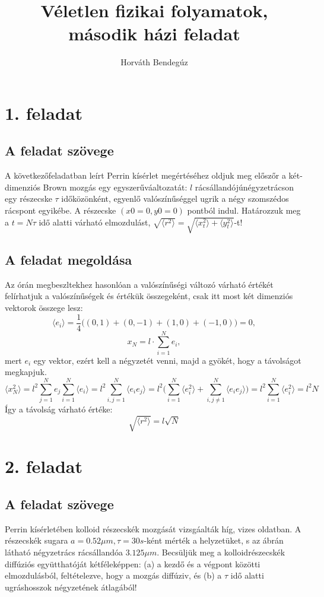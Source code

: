 \documentclass[12pt]{article}
\title{Véletlen fizikai folyamatok, második házi feladat}
\author{Horváth Bendegúz}
\begin{document}
\maketitle



\section*{1. feladat}

\subsection*{ A feladat szövege} A következőfeladatban leírt Perrin kísérlet megértéséhez oldjuk meg előszőr a két-dimenziós Brown mozgás
egy egyszerűváaltozatát: $l$ rácsállandójúnégyzetrácson egy részecske $\tau$ időközönként, egyenlő valószínűséggel ugrik a négy szomszédos rácspont egyikébe. A részecske $ (x0 = 0, y0 = 0)$ pontból indul.
Határozzuk meg a $t = N\tau $ idő alatti várható elmozdulást,  $\sqrt{\langle r^2 \rangle }= \sqrt{\langle x^2_t \rangle+ \langle y^2_t\rangle}$-t!

 
\subsection*{A feladat megoldása} Az órán megbeszltekhez hasonlóan a valószínűségi változó várható értékét felírhatjuk a valószínűségek és értékük összegeként, csak itt most két dimenziós vektorok összege lesz:
$$\langle e_i \rangle = \frac{1}{4}\big ( (0, 1)+(0,-1)+(1,0)+(-1,0)\big ) =0, $$
$$ x_N = l\cdot \sum_{i=1}^N e_i,$$
mert $e_i$ egy vektor, ezért kell a négyzetét venni, majd a gyökét, hogy a távolságot megkapjuk.
$$\langle x^2_N\rangle = l^2\sum_{j=1}^Ne_j\sum_{i=1}^N \langle e_i \rangle = l^2\sum_{i,j=1}^N \langle e_i e_j\rangle = l^2 \Big (\sum_{i=1}^N \langle e^2_i \rangle +\sum_{i,j \neq 1}^N\langle e_i e_j \rangle \Big ) = l^2 \sum_{i=1}^N \langle e^2_i \rangle = {l^2N}$$
Így a távolság várható értéke:
$$\sqrt{\langle r^2 \rangle} = l\sqrt{N} $$
 
\newpage
\section*{2. feladat}

\subsection*{ A feladat szövege}
Perrin kísérletében kolloid részecskék mozgását vizsgáalták híg, vizes oldatban. A részecskék sugara
$a = 0.52\mu m, \tau = 30s$-ként mérték a helyzetüket, s az ábrán látható négyzetrács rácsállandóa $3.125\mu m$. Becsüljük meg a kolloidrészecskék diffúziós együtthatóját kétféleképpen: (a) a kezdő és a végpont közötti elmozdulásból, feltételezve, hogy a mozgás diffúziv, és (b) a $\tau$ idő alatti ugráshosszok négyzetének átlagából!
\end{document}
